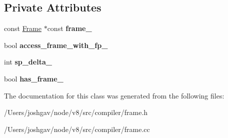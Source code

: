 \subsection*{Private Attributes}
\begin{DoxyCompactItemize}
\item 
const \hyperlink{classv8_1_1internal_1_1compiler_1_1_frame}{Frame} $\ast$const {\bfseries frame\+\_\+}\hypertarget{classv8_1_1internal_1_1compiler_1_1_frame_access_state_acec2f311cf71c3911aadb8a6218adf4d}{}\label{classv8_1_1internal_1_1compiler_1_1_frame_access_state_acec2f311cf71c3911aadb8a6218adf4d}

\item 
bool {\bfseries access\+\_\+frame\+\_\+with\+\_\+fp\+\_\+}\hypertarget{classv8_1_1internal_1_1compiler_1_1_frame_access_state_aec58d128fa8993c62a41788f909f2af8}{}\label{classv8_1_1internal_1_1compiler_1_1_frame_access_state_aec58d128fa8993c62a41788f909f2af8}

\item 
int {\bfseries sp\+\_\+delta\+\_\+}\hypertarget{classv8_1_1internal_1_1compiler_1_1_frame_access_state_aa3ebcdcdfcfb2e770a13dd208b16785d}{}\label{classv8_1_1internal_1_1compiler_1_1_frame_access_state_aa3ebcdcdfcfb2e770a13dd208b16785d}

\item 
bool {\bfseries has\+\_\+frame\+\_\+}\hypertarget{classv8_1_1internal_1_1compiler_1_1_frame_access_state_a20407010d2211464d017e20dc5b31679}{}\label{classv8_1_1internal_1_1compiler_1_1_frame_access_state_a20407010d2211464d017e20dc5b31679}

\end{DoxyCompactItemize}


The documentation for this class was generated from the following files\+:\begin{DoxyCompactItemize}
\item 
/\+Users/joshgav/node/v8/src/compiler/frame.\+h\item 
/\+Users/joshgav/node/v8/src/compiler/frame.\+cc\end{DoxyCompactItemize}
